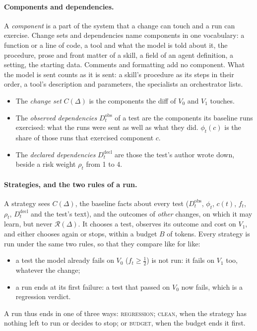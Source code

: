 \documentclass[11pt,a4paper]{article}
\newcommand{\Rev}{\mathcal{R}}
\newcommand{\clean}{\textsc{clean}}
\newcommand{\regression}{\textsc{regression}}
\newcommand{\budget}{\textsc{budget}}
\begin{document}
\paragraph{Components and dependencies.} A \emph{component} is a part of the system that a change can touch and a
run can exercise. Change sets and dependencies name components in one vocabulary: a function or a line of code, a
tool and what the model is told about it, the procedure, prose and front matter of a skill, a field of an agent
definition, a setting, the starting data. Comments and formatting add no component. What the model is sent counts
as it is sent: a skill's procedure as its steps in their order, a tool's description and parameters, the
specialists an orchestrator lists.
\begin{itemize}
  \item The \emph{change set} $C(\Delta)$ is the components the diff of $V_0$ and $V_1$ touches.
  \item The \emph{observed dependencies} $D^{\mathrm{obs}}_t$ of a test are the components its baseline runs
        exercised: what the runs were sent as well as what they did. $\phi_t(c)$ is the share of those runs that
        exercised component $c$.
  \item The \emph{declared dependencies} $D^{\mathrm{decl}}_t$ are those the test's author wrote down, beside a
        risk weight $\rho_t$ from 1 to 4.
\end{itemize}

\paragraph{Strategies, and the two rules of a run.} A strategy sees $C(\Delta)$, the baseline facts about every
test ($D^{\mathrm{obs}}_t$, $\phi_t$, $c(t)$, $f_t$, $\rho_t$, $D^{\mathrm{decl}}_t$ and the test's text), and the
outcomes of \emph{other} changes, on which it may learn, but never $\Rev(\Delta)$. It chooses a test, observes its
outcome and cost on $V_1$, and either chooses again or stops, within a budget $B$ of tokens. Every strategy is
run under the same two rules, so that they compare like for like:
\begin{itemize}
  \item a test the model already fails on $V_0$ ($f_t \ge \tfrac12$) is not run: it fails on $V_1$ too, whatever
        the change;
  \item a run ends at its first failure: a test that passed on $V_0$ now fails, which is a regression verdict.
\end{itemize}
A run thus ends in one of three ways: \regression{}; \clean{}, when the strategy has nothing left to run or
decides to stop; or \budget{}, when the budget ends it first.
\end{document}
